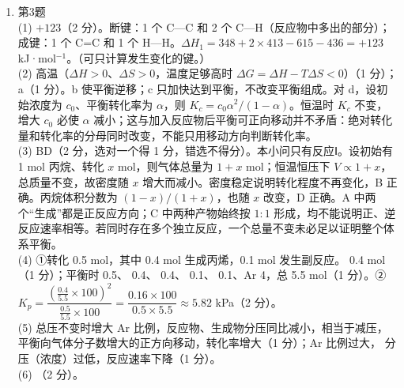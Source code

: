 \documentclass[UTF8,a4paper,zihao=5,oneside,openany,fontset=none]{ctexbook}
\newenvironment{jiexilist}{\small\begin{enumerate}[label={\textbf{\arabic*}.},leftmargin=1.6em,itemsep=0.3em,topsep=0.2em]}{\end{enumerate}}
\begin{document}
\begin{jiexilist}
\item 第3题\\
(1) $+123$（2 分）。断键：1 个 C—C 和 2 个 C—H（反应物中多出的部分）；成键：1 个 C=C 和 1 个 H—H。$\Delta H_1=348+2\times413-615-436=+123$ kJ·mol$^{-1}$。（可只计算发生变化的键。）\\
(2) 高温（$\Delta H>0$、$\Delta S>0$，温度足够高时 $\Delta G=\Delta H-T\Delta S<0$）（1 分）；a（1 分）。b 使平衡逆移；c 只加快达到平衡，不改变平衡组成。对 d，设初始浓度为 $c_0$、平衡转化率为 $\alpha$，则 $K_c=c_0\alpha^2/(1-\alpha)$。恒温时 $K_c$ 不变，增大 $c_0$ 必使 $\alpha$ 减小；这与加入反应物后平衡可正向移动并不矛盾：绝对转化量和转化率的分母同时改变，不能只用移动方向判断转化率。\\
(3) BD（2 分，选对一个得 1 分，错选不得分）。本小问只有反应Ⅰ。设初始有 1 mol 丙烷、转化 $x$ mol，则气体总量为 $1+x$ mol；恒温恒压下 $V\propto1+x$，总质量不变，故密度随 $x$ 增大而减小。密度稳定说明转化程度不再变化，B 正确。丙烷体积分数为 $(1-x)/(1+x)$，也随 $x$ 改变，D 正确。A 中两个“生成”都是正反应方向；C 中两种产物始终按 $1:1$ 形成，均不能说明正、逆反应速率相等。若同时存在多个独立反应，一个总量不变未必足以证明整个体系平衡。\\
(4) ①转化  0.5 mol，其中 0.4 mol 生成丙烯，0.1 mol 发生副反应。 0.4 mol（1 分）；平衡时  0.5、 0.4、 0.4、 0.1、 0.1、Ar 4，总 5.5 mol（1 分）。②$K_p=\dfrac{(\frac{0.4}{5.5}\times100)^2}{\frac{0.5}{5.5}\times100}=\dfrac{0.16\times100}{0.5\times5.5}\approx5.82$ kPa（2 分）。\\
(5) 总压不变时增大 Ar 比例，反应物、生成物分压同比减小，相当于减压，平衡向气体分子数增大的正方向移动，转化率增大（1 分）；Ar 比例过大， 分压（浓度）过低，反应速率下降（1 分）。\\
(6) （2 分）。


\end{jiexilist}
\end{document}
